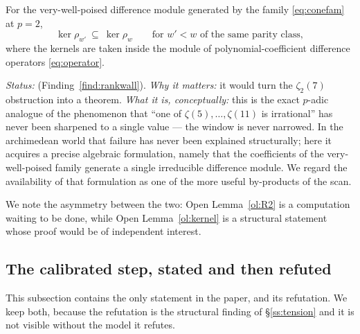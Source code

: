 \begin{openlemma}\label{ol:kernel}
\OPENC{} For the very-well-poised difference module generated by the family
\eqref{eq:conefam} at $p=2$,
\[
 \ker\rho_{w'}\ \subseteq\ \ker\rho_{w}\qquad\text{for }w'<w\text{ of the same parity class},
\]
where the kernels are taken inside the module of polynomial-coefficient difference operators
\eqref{eq:operator}.

\emph{Status:} 
(Finding~\ref{find:rankwall}). \emph{Why it matters:} it would turn the $\zeta_2(7)$
obstruction into a theorem. \emph{What it is, conceptually:} this is the exact $p$-adic
analogue of the phenomenon that ``one of $\zeta(5),\dots,\zeta(11)$ is irrational'' has never
been sharpened to a single value --- the window is never narrowed. In the archimedean world
that failure has never been explained structurally; here it acquires a precise algebraic
formulation, namely that the coefficients of the very-well-poised family generate a single
irreducible difference module. We regard the availability of that formulation as one of the
more useful by-products of the scan.
\end{openlemma}

We note the asymmetry between the two: Open Lemma~\ref{ol:R2} is a computation waiting to be
done, while Open Lemma~\ref{ol:kernel} is a structural statement whose proof would be of
independent interest.

\subsection{The calibrated step, stated and then refuted}\label{ss:calibrated}

This subsection contains the only \CALIB{} statement in the paper, and its refutation.
We keep both, because the refutation is the structural finding of \S\ref{ss:tension} and it
is not visible without the model it refutes.

